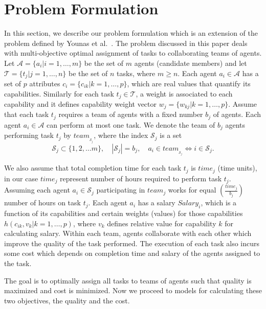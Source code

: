 \documentclass{sig-alternate}
\begin{document}
\section{Problem Formulation}
\label{sec: model}
In this section, we describe our problem formulation which is an extension of 
the problem defined by Younas et al.~\cite{irfan2011}. The problem discussed 
in this paper deals with multi-objective optimal assignment of tasks to 
collaborating teams of agents.
Let $\mathcal{A} = \{a_i|i=1, \dots, m\}$ be the set of $m$ agents 
(candidate members) and let $\mathcal{T} = \{t_j|j=1, \dots, n\}$ be the set 
of $n$ tasks, where $m \geq n$. 
Each agent $a_i \in \mathcal{A}$ has a set of $p$ 
attributes $c_i = \{c_{ik}|k=1, \dots, p\}$, which are real values that 
quantify its capabilities. Similarly for each task $t_j \in \mathcal{T}$, 
a weight is associated to each capability and it defines 
capability weight vector $w_j = \{w_{kj}|k=1, \dots, p\}$. Assume that each 
task $t_j$ requires a team of agents with a fixed 
number $b_{j}$ of agents. 
Each agent $a_i \in \mathcal{A}$ can perform at most one task.
We denote the team of $b_j$ agents performing task $t_j$ by
$team_{_{\mathcal{S}_j}}$, where the index $\mathcal{S}_j$ is a set
\begin{equation*} 
\mathcal{S}_j \subset \{1, 2, \dots m\}, 
\quad |\mathcal{S}_j| = b_j, \quad a_i \in team_{_{\mathcal{S}_j}} 
\Leftrightarrow i \in \mathcal{S}_j.
\end{equation*}

We also assume that total completion time for each task $t_j$ 
is $time_j$ (time units), in our case $time_j$ represent number of hours 
required to perform task $t_j$. 
Assuming each agent $a_i \in \mathcal{S}_j$ participating in $team_j$ works 
for equal $\left(\frac{time_j}{b_j}\right)$ number of hours on task $t_{j}$. 
Each agent $a_i$ has a salary $Salary_i$, which is a function of its 
capabilities and certain weights (values) for those 
capabilities $h(c_{ik}, v_{k}|k=1, \dots, p)$, where $v_{k}$ defines relative 
value for capability $k$ for calculating salary. 
Within each team, agents collaborate with each other which improve the 
quality of the task performed. 
The execution of each task also incurs some cost which depends on completion 
time and salary of the agents assigned to the task.


The goal is to optimally assign all tasks to teams of agents such that quality 
is maximized and cost is minimized. Now we proceed to models for calculating 
these two objectives, the quality and the cost.
\end{document}
